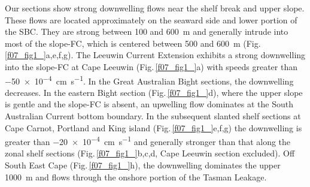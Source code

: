 \documentclass[preprint,3p,review,12pt]{elsarticle}
\begin{document}
Our sections show strong downwelling flows
near the shelf break and upper slope.
These flows are located approximately
on the seaward side and lower portion of the SBC\@.
They are strong between \num{100} and \SI{600}{\meter} and generally intrude into most of the slope-FC, which is centered between \num{500} and \SI{600}{\meter} (Fig.\,\ref{f07_fig1_}a,e,f,g). The Leeuwin Current Extension exhibits a strong downwelling into the slope-FC at Cape Leeuwin (Fig.\,\ref{f07_fig1_}a) with speeds greater than \SI{-50 e-4}{\centi\meter\per\second}.
In the Great Australian Bight sections, the downwelling decreases. In the eastern Bight section (Fig.\,\ref{f07_fig1_}d), where the upper slope is gentle and the slope-FC is absent, an upwelling flow dominates at the South Australian Current bottom boundary. In the subsequent slanted shelf sections at Cape Carnot, Portland and King island (Fig.\,\ref{f07_fig1_}e,f,g) the downwelling is greater than \SI{-20 e-4}{\centi\meter\per\second} and generally stronger than that along the zonal shelf sections (Fig.\,\ref{f07_fig1_}b,c,d, Cape Leeuwin section excluded). Off South East Cape (Fig.\,\ref{f07_fig1_}h), the downwelling dominates the upper \SI{1000}{\meter} and flows through the onshore portion of the Tasman Leakage.
%
\end{document}
